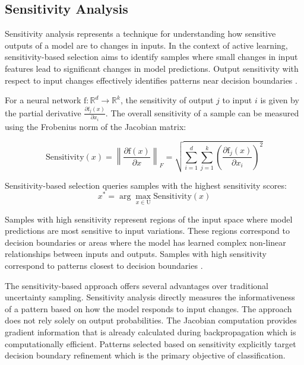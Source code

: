 \documentclass[conference]{IEEEtran}
\newcommand{\set}[1]{\mathrm{#1}}
\newcommand{\func}[1]{\mathrm{#1}}
\begin{document}
\subsection{Sensitivity Analysis}

Sensitivity analysis represents a technique for understanding how sensitive outputs of a model are to changes in inputs. In the context of active learning, sensitivity-based selection aims to identify samples where small changes in input features lead to significant changes in model predictions. Output sensitivity with respect to input changes effectively identifies patterns near decision boundaries \cite{engelbrecht2001sensitivity}.

For a neural network $\func{f}: \mathbb{R}^d \rightarrow \mathbb{R}^k$, the sensitivity of output $j$ to input $i$ is given by the partial derivative $\frac{\partial \func{f}_j(x)}{\partial x_i}$. The overall sensitivity of a sample can be measured using the Frobenius norm of the Jacobian matrix:

\begin{equation}
\text{Sensitivity}(x) = \left\|\frac{\partial \func{f}(x)}{\partial x}\right\|_F = \sqrt{\sum_{i=1}^d \sum_{j=1}^k \left(\frac{\partial \func{f}_j(x)}{\partial x_i}\right)^2}
\end{equation}

Sensitivity-based selection queries samples with the highest sensitivity scores:
\begin{equation}
x^* = \arg\max_{x \in \set{U}} \text{Sensitivity}(x)
\end{equation}

Samples with high sensitivity represent regions of the input space where model predictions are most sensitive to input variations. These regions correspond to decision boundaries or areas where the model has learned complex non-linear relationships between inputs and outputs. Samples with high sensitivity correspond to patterns closest to decision boundaries \cite{engelbrecht2001sensitivity}.

The sensitivity-based approach offers several advantages over traditional uncertainty sampling. Sensitivity analysis directly measures the informativeness of a pattern based on how the model responds to input changes. The approach does not rely solely on output probabilities. The Jacobian computation provides gradient information that is already calculated during backpropagation which is computationally efficient. Patterns selected based on sensitivity explicitly target decision boundary refinement which is the primary objective of classification.
\end{document}
